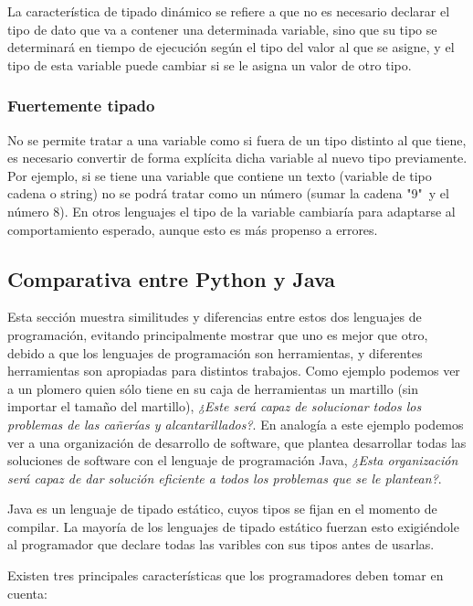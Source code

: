 \documentclass[12pt,legalpaper]{report}
\begin{document}
La característica de tipado dinámico se refiere a que no es necesario declarar el tipo de dato que va a contener una determinada variable, sino que su tipo se determinará en tiempo de ejecución según el tipo del valor al que se asigne, y el tipo de esta variable puede cambiar si se le asigna un valor de otro tipo.


			\subsubsection{Fuertemente tipado}

No se permite tratar a una variable como si fuera de un tipo distinto al que tiene, es necesario convertir de forma explícita dicha variable al nuevo tipo previamente. Por ejemplo, si se tiene una variable que contiene un texto (variable de tipo cadena o string) no se podrá tratar como un número (sumar la cadena "9"\ y el número 8). En otros lenguajes el tipo de la variable cambiaría para adaptarse al comportamiento esperado, aunque esto es más propenso a errores.

		\subsection{Comparativa entre Python y Java}

Esta sección muestra similitudes y diferencias entre estos dos lenguajes de programación, evitando principalmente mostrar que uno es mejor que otro, debido a que los lenguajes de programación son herramientas, y diferentes herramientas son apropiadas para distintos trabajos.  Como ejemplo podemos ver a un plomero quien sólo tiene en su caja de herramientas un martillo (sin importar el tamaño del martillo), \textit{¿Este será capaz de solucionar todos los problemas de las cañerías y alcantarillados?}.  En analogía a este ejemplo podemos ver a una organización de desarrollo de software, que plantea desarrollar todas las soluciones de software con el lenguaje de programación Java, \textit{¿Esta organización será capaz de dar solución eficiente a todos los problemas que se le plantean?}.

Java es un lenguaje de tipado estático, cuyos tipos se fijan en el momento de compilar. La mayoría de los lenguajes de tipado estático fuerzan esto exigiéndole al programador que declare todas las varibles con sus tipos antes de usarlas. 

Existen tres principales características que los programadores deben tomar en cuenta: \newpage
\end{document}
